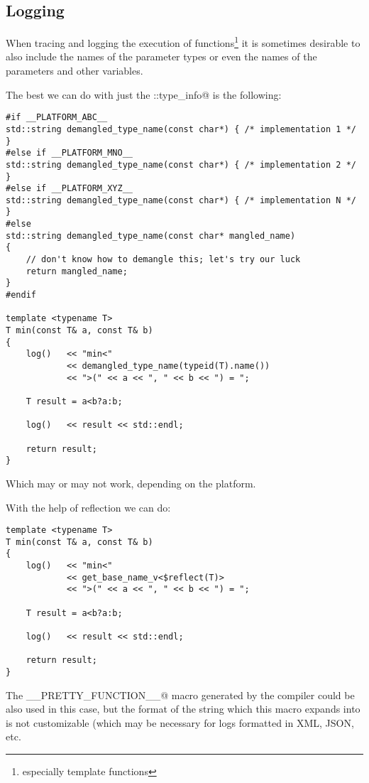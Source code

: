 \subsection{Logging}

When tracing and logging the execution of functions\footnote{especially template
functions} it is sometimes desirable to also include the names of the parameter
types or even the names of the parameters and other variables.

The best we can do with just the \verb@std::type_info@ is the following:

\begin{verbatim}
#if __PLATFORM_ABC__
std::string demangled_type_name(const char*) { /* implementation 1 */ }
#else if __PLATFORM_MNO__
std::string demangled_type_name(const char*) { /* implementation 2 */ }
#else if __PLATFORM_XYZ__
std::string demangled_type_name(const char*) { /* implementation N */ }
#else
std::string demangled_type_name(const char* mangled_name)
{
	// don't know how to demangle this; let's try our luck
	return mangled_name;
}
#endif

template <typename T>
T min(const T& a, const T& b)
{
	log()   << "min<"
	        << demangled_type_name(typeid(T).name())
	        << ">(" << a << ", " << b << ") = ";

	T result = a<b?a:b;

	log()   << result << std::endl;

	return result;
}

\end{verbatim}

Which may or may not work, depending on the platform.

With the help of reflection we can do:

\begin{verbatim}
template <typename T>
T min(const T& a, const T& b)
{
	log()   << "min<"
	        << get_base_name_v<$reflect(T)>
	        << ">(" << a << ", " << b << ") = ";

	T result = a<b?a:b;

	log()   << result << std::endl;

	return result;
}
\end{verbatim}

The \verb@__PRETTY_FUNCTION__@ macro generated by the compiler could be also
used in this case, but the format of the string which this macro expands into
is not customizable (which may be necessary for logs formatted in XML, JSON, etc.

